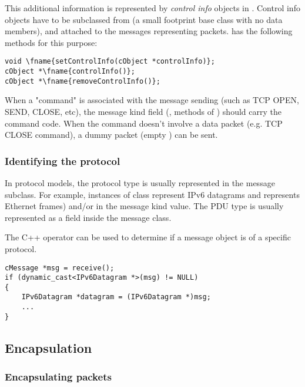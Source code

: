 This additional information is represented by \textit{control info}
objects in {\opp}. Control info objects have to be subclassed from
 (a small footprint base class with
no data members), and attached to the messages representing
packets.  has the following methods for this
purpose:

\begin{Verbatim}[commandchars=\\\{\}]
void \fname{setControlInfo(cObject *controlInfo)};
cObject *\fname{controlInfo()};
cObject *\fname{removeControlInfo()};
\end{Verbatim}

When a "command" is associated with the message sending (such as
TCP OPEN, SEND, CLOSE, etc), the message kind field (,
 methods of ) should carry the command code.
When the command doesn't involve a data packet (e.g.
TCP CLOSE command), a dummy packet (empty ) can be sent.



\subsubsection{Identifying the protocol}

In {\opp} protocol models, the protocol type is usually represented
in the message subclass. For example, instances of class
 represent IPv6 datagrams and 
represents Ethernet frames) and/or in the message kind value.
The PDU type is usually represented as a field inside the message class.

The C++  operator can be used to determine
if a message object is of a specific protocol.

\begin{verbatim}
cMessage *msg = receive();
if (dynamic_cast<IPv6Datagram *>(msg) != NULL)
{
    IPv6Datagram *datagram = (IPv6Datagram *)msg;
    ...
}
\end{verbatim}


\subsection{Encapsulation}

\subsubsection{Encapsulating packets}

